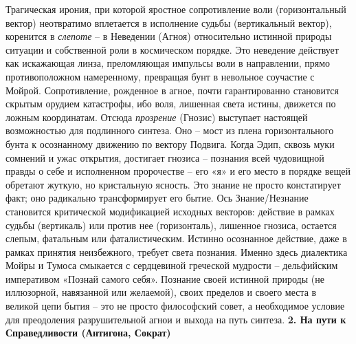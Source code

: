     Трагическая ирония, при которой яростное сопротивление воли (горизонтальный вектор) неотвратимо вплетается в исполнение судьбы (вертикальный вектор), коренится в \textit{слепоте} – в Неведении (Агноя) относительно истинной природы ситуации и собственной роли в космическом порядке. Это неведение действует как искажающая линза, преломляющая импульсы воли в направлении, прямо противоположном намеренному, превращая бунт в невольное соучастие с Мойрой. Сопротивление, рожденное в агное, почти гарантированно становится скрытым орудием катастрофы, ибо воля, лишенная света истины, движется по ложным координатам. Отсюда \textit{прозрение} (Гнозис) выступает настоящей возможностью для подлинного синтеза. Оно – мост из плена горизонтального бунта к осознанному движению по вектору Подвига. Когда Эдип, сквозь муки сомнений и ужас открытия, достигает гнозиса – познания всей чудовищной правды о себе и исполненном пророчестве – его «я» и его место в порядке вещей обретают жуткую, но кристальную ясность. Это знание не просто констатирует факт; оно радикально трансформирует его бытие. Ось Знание/Незнание становится критической модификацией исходных векторов: действие в рамках судьбы (вертикаль) или против нее (горизонталь), лишенное гнозиса, остается слепым, фатальным или фаталистическим. Истинно осознанное действие, даже в рамках принятия неизбежного, требует света познания. Именно здесь диалектика Мойры и Тумоса смыкается с сердцевиной греческой мудрости – дельфийским императивом «Познай самого себя». Познание своей истинной природы (не иллюзорной, навязанной или желаемой), своих пределов и своего места в великой цепи бытия – это не просто философский совет, а необходимое условие для преодоления разрушительной агнои и выхода на путь синтеза.
    \textbf{2. На пути к Справедливости (Антигона, Сократ)}
